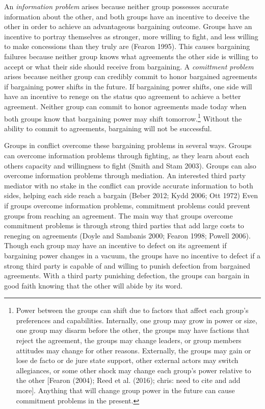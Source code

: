 \documentclass[11pt]{article}
\begin{document}
An \emph{information problem} arises because neither group possesses
accurate information about the other, and both groups have an incentive
to deceive the other in order to achieve an advantageous bargaining
outcome. Groups have an incentive to portray themselves as stronger,
more willing to fight, and less willing to make concessions than they
truly are (Fearon 1995). This causes bargaining failures because neither
group knows what agreements the other side is willing to accept or what
their side should receive from bargaining. A \emph{comittment problem}
arises because neither group can credibly commit to honor bargained
agreements if bargaining power shifts in the future. If bargaining power
shifts, one side will have an incentive to renege on the status quo
agreement to achieve a better agreement. Neither group can commit to
honor agreements made today when both groups know that bargaining power
may shift tomorrow.\footnote{Power between the groups can shift due to
  factors that affect each group's preferences and capabilities.
  Internally, one group may grow in power or size, one group may disarm
  before the other, the groups may have factions that reject the
  agreement, the groups may change leaders, or group members attitudes
  may change for other reasons. Externally, the groups may gain or lose
  de facto or de jure state support, other external actors may switch
  allegiances, or some other shock may change each group's power
  relative to the other {[}Fearon (2004); Reed et al. (2016); chris:
  need to cite and add more{]}. Anything that will change group power in
  the future can cause commitment problems in the present.} Without the
ability to commit to agreements, bargaining will not be successful.

Groups in conflict overcome these bargaining problems in several ways.
Groups can overcome information problems through fighting, as they learn
about each others capacity and willingness to fight (Smith and Stam
2003). Groups can also overcome information problems through mediation.
An interested third party mediator with no stake in the conflict can
provide accurate information to both sides, helping each side reach a
bargain (Beber 2012; Kydd 2006; Ott 1972) Even if groups overcome
information problems, commitment problems could prevent groups from
reaching an agreement. The main way that groups overcome commitment
problems is through strong third parties that add large costs to
reneging on agreements (Doyle and Sambanis 2000; Fearon 1998; Powell
2006). Though each group may have an incentive to defect on its
agreement if bargaining power changes in a vacuum, the groups have no
incentive to defect if a strong third party is capable of and willing to
punish defection from bargained agreements. With a third party punishing
defection, the groups can bargain in good faith knowing that the other
will abide by its word.
\end{document}
